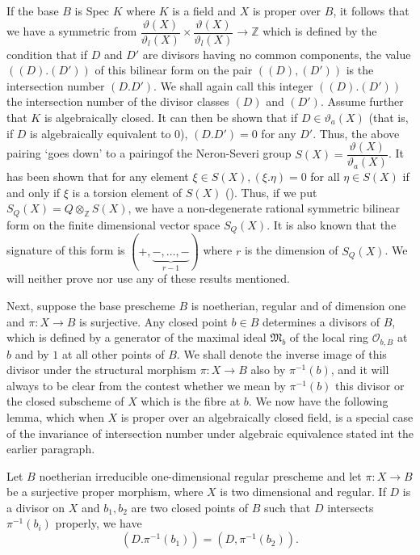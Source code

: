 If the base $B$ is Spec $K$ where $K$ is a field and $X$ is proper
over $B$, it follows that we have a symmetric from
$\dfrac{\vartheta(X)}{\vartheta_l(X)} \times
\dfrac{\vartheta(X)}{\vartheta_l (X)}\to \mathbb{Z}$ 
which is defined by the condition that if $D$ and $D'$ are
divisors having no common components, the value $((D).(D'))$ of this
bilinear form on the pair $((D),(D'))$ is the intersection number
$(D.D')$. We shall again call this integer $((D).(D'))$ the
intersection number of the divisor classes $(D)$ and $(D')$. Assume
further that $K$ is algebraically closed. It can then be shown that if
$D\in \vartheta_a(X)$ (that is, if $D$ is algebraically equivalent to
$0$), $(D.D')=0$ for any $D'$. Thus, the above pairing `goes down' to
a pairing\pageoriginale  of the Neron-Severi group
$S(X)=\dfrac{\vartheta(X)}{\vartheta_a(X)}$. It has been shown that
for any element $\xi \in S(X), (\xi .\eta)=0$ for all $\eta \in S(X)$
if and only if $\xi$ is a torsion element of $S(X)$ (\cite{key22}). Thus, if we
put $S_{Q}(X)=Q\otimes_{\mathbb{Z}}S(X)$, we have a non-degenerate
rational symmetric bilinear form on the finite dimensional vector space
$S_Q(X)$. It is also known that the signature of this form is
$(+,\underbrace{-,\ldots,-}_{r-1})$ where $r$ is the dimension of
$S_Q(X)$. We will neither prove nor use any of these results
mentioned. 

Next, suppose the base prescheme $B$ is noetherian, regular and of
dimension one and $\pi : X\to B$ is surjective. Any closed point $b\in B$
determines a divisors of $B$, which is defined by a generator of the
maximal ideal $\mathfrak{M}_b$ of the local ring $\mathscr{O}_{b, B}$ at
$b$ and by $1$ at all other points of $B$. We shall denote the inverse
image of this divisor under the structural morphism $\pi:X\to B$ also
by $\pi^{-1}(b)$, and it will always to be clear from the contest
whether we mean by $\pi^{-1}(b)$ this divisor or the closed subscheme
of $X$ which is the fibre at $b$. We now have the following lemma,
which when $X$ is proper over an algebraically closed field, is a
special case of the invariance of intersection number under algebraic
equivalence stated int the earlier paragraph.  

\begin{lemma*}%
  Let $B$ noetherian irreducible one-dimensional regular presch\-eme and
  let $\pi: X\to B$ be a surjective proper morphism, where $X$ is two
  dimensional and regular. If $D$ is a divisor on $X$ and $b_1,b_2$ are
  two closed points of $B$ such that $D$ intersects $\pi^{-1}(b_i)$
  properly, we have\pageoriginale   
  \begin{equation*}
    (D.\pi^{-1}(b_1))=(D,\pi^{-1}(b_2)).\tag{5}\label{chap6:eq5}
  \end{equation*}
\end{lemma*}

